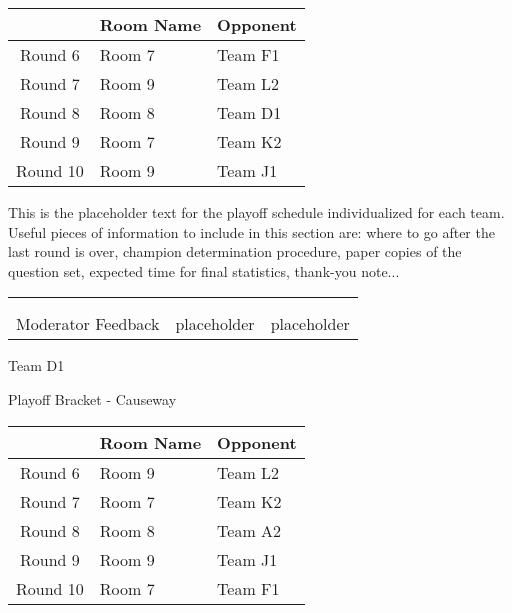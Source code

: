 \documentclass{article}%
\begin{document}
\vspace*{4pt}%
%
\begin{tabularx}{\textwidth}{|c|Y|Y|}%
\hline%
&Room Name&Opponent\\%
\hline%
Round 6&Room 7&Team F1\\%
Round 7&Room 9&Team L2\\%
Round 8&Room 8&Team D1\\%
Round 9&Room 7&Team K2\\%
Round 10&Room 9&Team J1\\%
\hline%
\end{tabularx}%
\vspace*{30pt}%
\linebreak%
This is the placeholder text for the playoff schedule individualized for each team. Useful pieces of information to include in this section are: where to go after the last round is over, champion determination procedure, paper copies of the question set, expected time for final statistics, thank{-}you note...%
\vspace*{30pt}%
\newline%
%
\begin{tabularx}{\textwidth}{YYY}%
  &  &  \\%
\\%
Moderator Feedback&placeholder&placeholder\\%
\end{tabularx}%
\newpage%
\begin{center}%
\begin{Huge}%
Team D1%
\end{Huge}%
\vspace*{12pt}%
\linebreak%
\begin{Large}%
Playoff Bracket {-} Causeway%
\end{Large}%
\end{center}%
\vspace*{4pt}%
%
\begin{tabularx}{\textwidth}{|c|Y|Y|}%
\hline%
&Room Name&Opponent\\%
\hline%
Round 6&Room 9&Team L2\\%
Round 7&Room 7&Team K2\\%
Round 8&Room 8&Team A2\\%
Round 9&Room 9&Team J1\\%
Round 10&Room 7&Team F1\\%
\hline%
\end{tabularx}%
\end{document}
